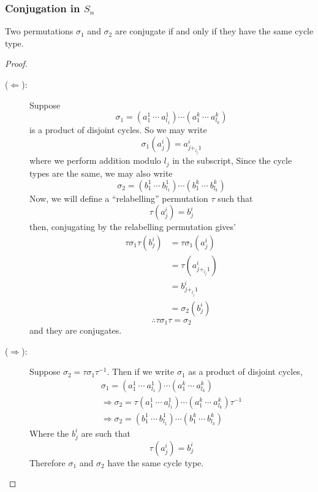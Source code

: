 \documentclass{article}
\begin{document}
\subsubsection*{Conjugation in $S_n$}
\begin{thm}[Conjugation in $S_n$]
    Two permutations $\sigma_1$ and $\sigma_2$ are conjugate if and only if they have the same cycle type.    
\end{thm}
\begin{proof}\leavevmode
    \begin{description}
        \item[($\Longleftarrow$):] Suppose
        \[
            \sigma_1 = (a^1_1\ \cdots\ a^1_{l_1}) \cdots (a^k_1\ \cdots\ a^k_{l_k})  
        \]
        is a product of disjoint cycles. So we may write
        \[
            \sigma_1(a^i_j) = a^i_{j +_{l_j} 1} 
        \]
        where we perform addition modulo $l_j$ in the subscript, Since the cycle types are the same, we may also write
        \[
            \sigma_2 = (b^1_1\ \cdots\ b^1_{l_1}) \cdots (b^k_1\ \cdots\ b^k_{l_k})   
        \]
        Now, we will define a ``relabelling'' permutation $\tau$ such that
        \[
            \tau(a^i_j) = b^i_j  
        \]
        then, conjugating by the relabelling permutation gives'
        \begin{align*}
            \tau \sigma_1 \tau (b^i_j) &= \tau \sigma_1(a^i_j) \\
            &= \tau(a^i_{j +_{l_j} 1}) \\
            &= b^i_{j +_{l_j} 1} \\
            &= \sigma_2(b^i_j)
        \end{align*}
        \[
            \therefore \tau \sigma_1 \tau = \sigma_2 
        \]
        and they are conjugates.
        \item[($\Longrightarrow$):] Suppose $\sigma_2 = \tau \sigma_1 \tau^{-1}$. Then if we write $\sigma_1$ as a product of disjoint cycles,
        \begin{align*}
            \sigma_1 = (a^1_1\ \cdots\ a^1_{l_1}) \cdots (a^k_1\ \cdots\ a^k_{l_k}) \\
            \Rightarrow \sigma_2 = \tau (a^1_1\ \cdots\ a^1_{l_1}) \cdots (a^k_1\ \cdots\ a^k_{l_k}) \tau^{-1} \\
            \Rightarrow \sigma_2 = (b^1_1\ \cdots\ b^1_{l_1}) \cdots (b^k_1\ \cdots\ b^k_{l_k})
        \end{align*}
        Where the $b^i_j$ are such that
        \[
            \tau(a^i_j) = b^i_j  
        \]
        Therefore $\sigma_1$ and $\sigma_2$ have the same cycle type.
    \end{description}
\end{proof}
\end{document}
